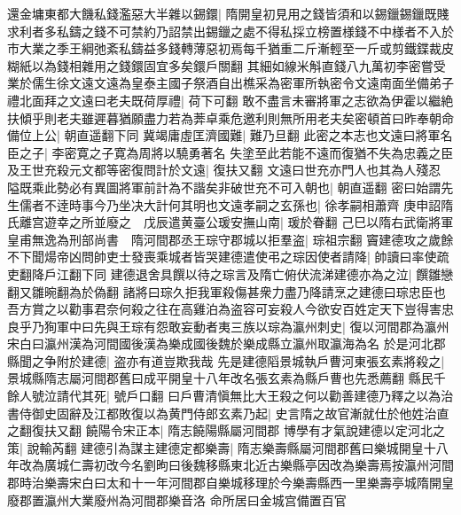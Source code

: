 還金墉東都大饑私錢濫惡大半雜以錫鐶|{
	隋開皇初見用之錢皆須和以錫鑞錫鑞既賤求利者多私鑄之錢不可禁約乃詔禁出錫鑞之處不得私採立榜置様錢不中様者不入於市大業之季王綱弛紊私鑄益多錢轉薄惡初焉每千猶重二斤漸輕至一斤或剪鐵鍱裁皮糊紙以為錢相雜用之錢鐶固宜多矣鐶戶關翻}
其細如線米斛直錢八九萬初李密嘗受業於儒生徐文遠文遠為皇泰主國子祭酒自出樵采為密軍所執密令文遠南面坐備弟子禮北面拜之文遠曰老夫既荷厚禮|{
	荷下可翻}
敢不盡言未審將軍之志欲為伊霍以繼絶扶傾乎則老夫雖遲暮猶願盡力若為莾卓乘危邀利則無所用老夫矣密頓首曰昨奉朝命備位上公|{
	朝直遥翻下同}
冀竭庸虛匡濟國難|{
	難乃旦翻}
此密之本志也文遠曰將軍名臣之子|{
	李密寛之子寛為周將以驍勇著名}
失塗至此若能不遠而復猶不失為忠義之臣及王世充殺元文都等密復問計於文遠|{
	復扶又翻}
文遠曰世充亦門人也其為人殘忍隘既乘此勢必有異圖將軍前計為不諧矣非破世充不可入朝也|{
	朝直遥翻}
密曰始謂先生儒者不逹時事今乃坐决大計何其明也文遠孝嗣之玄孫也|{
	徐孝嗣相蕭齊}
庚申詔隋氏離宫遊幸之所並廢之　戊辰遣黄臺公瑗安撫山南|{
	瑗於眷翻}
己巳以隋右武衛將軍皇甫無逸為刑部尚書　隋河間郡丞王琮守郡城以拒羣盗|{
	琮祖宗翻}
竇建德攻之歲餘不下聞煬帝凶問帥吏士發喪乘城者皆哭建德遣使弔之琮因使者請降|{
	帥讀曰率使疏吏翻降戶江翻下同}
建德退舍具饌以待之琮言及隋亡俯伏流涕建德亦為之泣|{
	饌雛戀翻又雛晼翻為於偽翻}
諸將曰琮久拒我軍殺傷甚衆力盡乃降請烹之建德曰琮忠臣也吾方賞之以勸事君奈何殺之往在高雞泊為盗容可妄殺人今欲安百姓定天下豈得害忠良乎乃狥軍中曰先與王琮有怨敢妄動者夷三族以琮為瀛州刺史|{
	復以河間郡為瀛州宋白曰瀛州漢為河間國後漢為樂成國後魏於樂成縣立瀛州取瀛海為名}
於是河北郡縣聞之争附於建德|{
	盗亦有道豈欺我哉}
先是建德䧟景城執戶曹河東張玄素將殺之|{
	景城縣隋志屬河間郡舊曰成平開皇十八年改名張玄素為縣戶曹也先悉薦翻}
縣民千餘人號泣請代其死|{
	號戶口翻}
曰戶曹清愼無比大王殺之何以勸善建德乃釋之以為治書侍御史固辭及江都敗復以為黄門侍郎玄素乃起|{
	史言隋之故官漸就仕於他姓治直之翻復扶又翻}
饒陽令宋正本|{
	隋志饒陽縣屬河間郡}
博學有才氣說建德以定河北之策|{
	說輸芮翻}
建德引為謀主建德定都樂壽|{
	隋志樂壽縣屬河間郡舊曰樂城開皇十八年改為廣城仁壽初改今名劉昫曰後魏移縣東北近古樂縣亭因改為樂壽焉按瀛州河間郡時治樂壽宋白曰太和十一年河間郡自樂城移理於今樂壽縣西一里樂壽亭城隋開皇廢郡置瀛州大業廢州為河間郡樂音洛}
命所居曰金城宫備置百官

